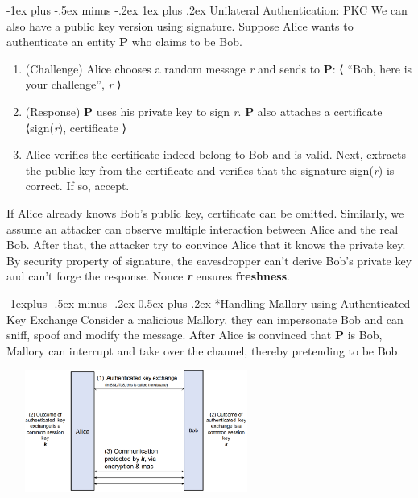 \documentclass[10pt,landscape]{article}
\makeatletter
\renewcommand{\subsection}{\@startsection{subsection}{2}{0mm}%
                                {-1explus -.5ex minus -.2ex}%
                                {0.5ex plus .2ex}%
                                {\normalfont\normalsize\bfseries}}
\renewcommand{\subsubsection}{\@startsection{subsubsection}{3}{0mm}%
                                {-1ex plus -.5ex minus -.2ex}%
                                {1ex plus .2ex}%
                                {\normalfont\small\bfseries}}
\makeatother
\begin{document}
\begin{multicols*}{3}
\subsubsection{Unilateral Authentication: PKC}
We can also have a public key version using signature. Suppose Alice wants
to authenticate an entity \textbf{P} who claims to be Bob.
\begin{enumerate}[noitemsep,wide=0pt, leftmargin=\dimexpr\labelwidth + 2\labelsep\relax]
    \item (Challenge) Alice chooses a random message \textit{r} and sends to \textbf{P}:
    ⟨ “Bob, here is your challenge”, \textit{r} ⟩
    \item (Response) \textbf{P} uses his private key to sign \textit{r}. \textbf{P} also attaches a certificate
    ⟨sign(\textit{r}), certificate ⟩
    \item Alice verifies the certificate indeed belong to Bob and is valid. Next, extracts
    the public key from the certificate and verifies that the signature sign(\textit{r}) is
    correct. If so, accept.
\end{enumerate}
If Alice already knows Bob's public key, certificate can be omitted. Similarly, we assume an attacker can observe multiple interaction between Alice
and the real Bob. After that, the attacker try to convince Alice that it knows the
private key. By security property of signature, the eavesdropper can’t derive
Bob’s private key and can’t forge the response. Nonce \textbf{\textit{r}} ensures \textbf{freshness}.

\subsection*{Handling Mallory using Authenticated Key Exchange}
Consider a malicious Mallory, they can impersonate Bob and can sniff, spoof and modify the message.
After Alice is convinced that \textbf{P} is Bob, Mallory can interrupt and take over the channel, thereby
pretending to be Bob.

\includegraphics[width=8.5cm, height=4cm]{images/authkeyexchange.png} 


\end{multicols*}
\end{document}
